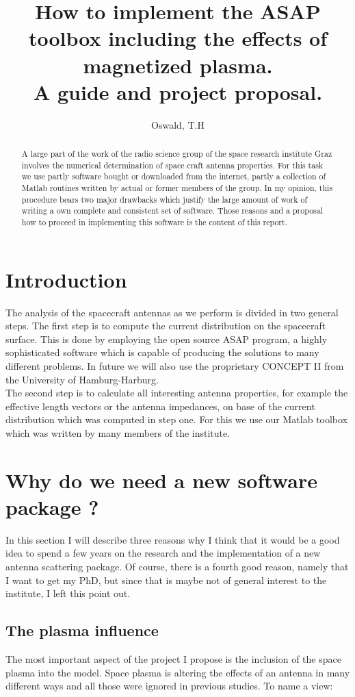 \documentclass[a4paper,10pt]{article}
\title{How to implement the ASAP toolbox including the effects of magnetized plasma.\\
A guide and project proposal.}
\author{Oswald, T.H}
\begin{document}
\maketitle
\newpage

\begin{abstract}
A large part of the work of the radio science group of the space research institute Graz involves the numerical determination of space craft antenna properties. For this task we use partly software bought or downloaded from the internet, partly a collection of Matlab routines written by actual or former members of the group. In my opinion, this procedure bears two major drawbacks which justify the large amount of work of writing a own complete and consistent set of software. Those reasons and a proposal how to proceed in implementing this software is the content of this report.
\end{abstract}
%
\newpage
\tableofcontents
\newpage
\section{Introduction}
The analysis of the spacecraft antennas as we perform is divided in two general steps. The first step is to compute the current distribution on the spacecraft surface. This is done by employing the open source ASAP program, a highly sophisticated software which is capable of producing the solutions to many different problems. In future we will also use the proprietary CONCEPT II from the University of Hamburg-Harburg.\\

The second step is to calculate all interesting antenna properties, for example the effective length vectors or the antenna impedances, on base of the current distribution which was computed in step one. For this we use our Matlab toolbox which was written by many members of the institute.

\section{Why do we need a new software package ?}
In this section I will describe three reasons why I think that it would be a good idea to spend a few years on the research and the implementation of a new antenna scattering package. Of course, there is a fourth good reason, namely that I want to get my PhD, but since that is maybe not of general interest to the institute, I left this point out.

\subsection{The plasma influence}
The most important aspect of the project I propose is the inclusion of the space plasma into the model. Space plasma is altering the effects of an antenna in many different ways and all those were ignored in previous studies. To name a view:
\end{document}

